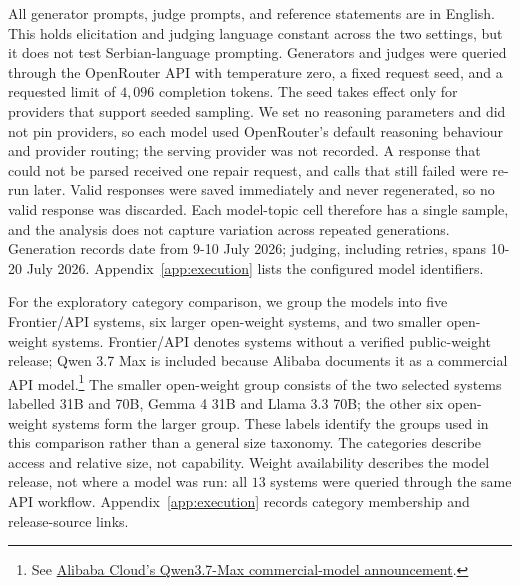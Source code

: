 \documentclass[11pt,a4paper]{article}
\begin{document}
All generator prompts, judge prompts, and reference statements are in English. This holds elicitation and judging language constant across the two settings, but it does not test Serbian-language prompting. Generators and judges were queried through the OpenRouter API with temperature zero, a fixed request seed, and a requested limit of $4{,}096$ completion tokens. The seed takes effect only for providers that support seeded sampling. We set no reasoning parameters and did not pin providers, so each model used OpenRouter's default reasoning behaviour and provider routing; the serving provider was not recorded. A response that could not be parsed received one repair request, and calls that still failed were re-run later. Valid responses were saved immediately and never regenerated, so no valid response was discarded. Each model-topic cell therefore has a single sample, and the analysis does not capture variation across repeated generations. Generation records date from 9-10 July 2026; judging, including retries, spans 10-20 July 2026. Appendix~\ref{app:execution} lists the configured model identifiers.

For the exploratory category comparison, we group the models into five Frontier/API systems, six larger open-weight systems, and two smaller open-weight systems. Frontier/API denotes systems without a verified public-weight release; Qwen 3.7 Max is included because Alibaba documents it as a commercial API model.\footnote{See \href{https://www.alibabacloud.com/en/news/product/maxcompute-model-computing-service-supports-qwen37-max-and-other-commercial-models-mkv}{Alibaba Cloud's Qwen3.7-Max commercial-model announcement}.} The smaller open-weight group consists of the two selected systems labelled 31B and 70B, Gemma 4 31B and Llama 3.3 70B; the other six open-weight systems form the larger group. These labels identify the groups used in this comparison rather than a general size taxonomy. The categories describe access and relative size, not capability. Weight availability describes the model release, not where a model was run: all $13$ systems were queried through the same API workflow. Appendix~\ref{app:execution} records category membership and release-source links.
\end{document}
